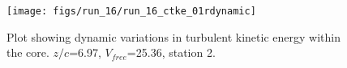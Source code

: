 \begin{figure}[H]
\centering
\texttt{[image: figs/run\_16/run\_16\_ctke\_01rdynamic]}
\caption{Plot showing dynamic variations in turbulent kinetic energy within the core. $z/c$=6.97, $V_{free}$=25.36, station 2.}
\label{fig:run_16_ctke_01rdynamic}
\end{figure}


